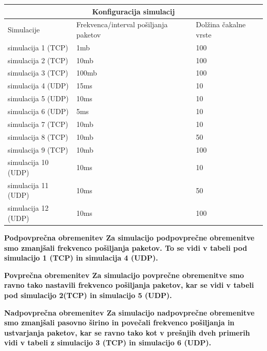 \documentclass[11pt, a4paper, slovene]{book}
\begin{document}
\begin{tabular}{|p{3cm}||p{3cm}|p{3cm}|}
	\hline
	\multicolumn{3}{|c|}{Konfiguracija simulacij} \\
	\hline
	Simulacije& Frekvenca/interval pošiljanja paketov& Dolžina čakalne vrste \\
	\hline 
	simulacija 1 (TCP)& 1mb & 100\\
	simulacija 2 (TCP)& 10mb & 100\\
	simulacija 3 (TCP)& 100mb & 100\\
	simulacija 4 (UDP)& 15ms & 10\\
	simulacija 5 (UDP)& 10ms & 10\\
	simulacija 6 (UDP)& 5ms & 10\\
	simulacija 7 (TCP)& 10mb &	10\\
	simulacija 8 (TCP)& 10mb & 50\\
	simulacija 9 (TCP)& 10mb & 100\\
	simulacija 10 (UDP)& 10ms & 10\\
	simulacija 11 (UDP)& 10ms & 50\\
	simulacija 12 (UDP)& 10ms & 100\\
	\hline
\end{tabular} 

\large \bf Podpovprečna obremenitev 
\normalfont \normalsize
Za simulacijo podpovprečne obremenitve smo zmanjšali frekvenco pošiljanja paketov. To se vidi v tabeli pod
simulacijo 1 (TCP) in simulacija 4 (UDP). 

\large \bf Povprečna obremenitev 
\normalfont \normalsize
Za simulacijo povprečne obremenitve smo ravno tako nastavili frekvenco pošiljanja paketov, kar se vidi v tabeli pod simulacijo 2(TCP) in simulacijo 5 (UDP). 

\large \bf Nadpovprečna obremenitev 
\normalfont \normalsize
Za simulacijo nadpovprečne obremenitve smo zmanjšali pasovno širino in povečali frekvenco pošiljanja in ustvarjanja paketov, kar se ravno tako kot v prešnjih dveh primerih vidi v tabeli z simulacijo 3 (TCP) in simulacijo 6 (UDP).
\end{document}
